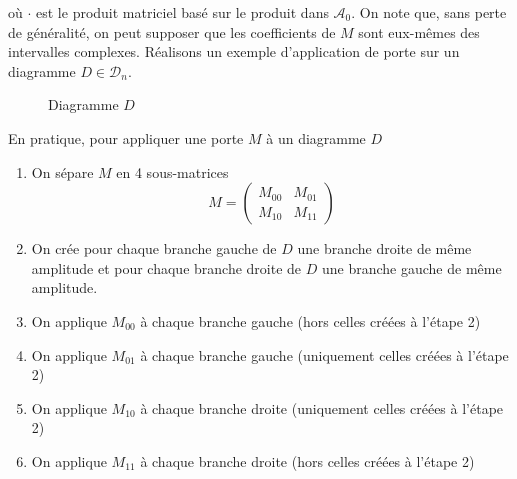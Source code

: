 \noindent où $\cdot$ est le produit matriciel basé sur le produit dans $\mathcal A_0$.
On note que, sans perte de généralité, on peut supposer que les coefficients de $M$ sont eux-mêmes des intervalles complexes. Réalisons un exemple d'application de porte sur un diagramme $D \in \mathcal D_n$.

\begin{figure}[ht]
  \centering
\caption{Diagramme $D$}
\label{fig:D_avant_porte}
\end{figure}

En pratique, pour appliquer une porte $M$ à un diagramme $D$
\begin{enumerate}
  \item On sépare $M$ en 4 sous-matrices
  $$M = \begin{pmatrix}
    M_{00} & M_{01} \\
    M_{10} & M_{11}
  \end{pmatrix}$$
  \item On crée pour chaque branche gauche de $D$ une branche droite  de même amplitude et pour chaque branche droite de $D$ une branche gauche de même amplitude.
  \item On applique $M_{00}$ à chaque branche gauche (hors celles créées à l'étape 2)
  \item On applique $M_{01}$ à chaque branche gauche (uniquement celles créées à l'étape 2)
  \item On applique $M_{10}$ à chaque branche droite (uniquement celles créées à l'étape 2)
  \item On applique $M_{11}$ à chaque branche droite (hors celles créées à l'étape 2)
\end{enumerate}

